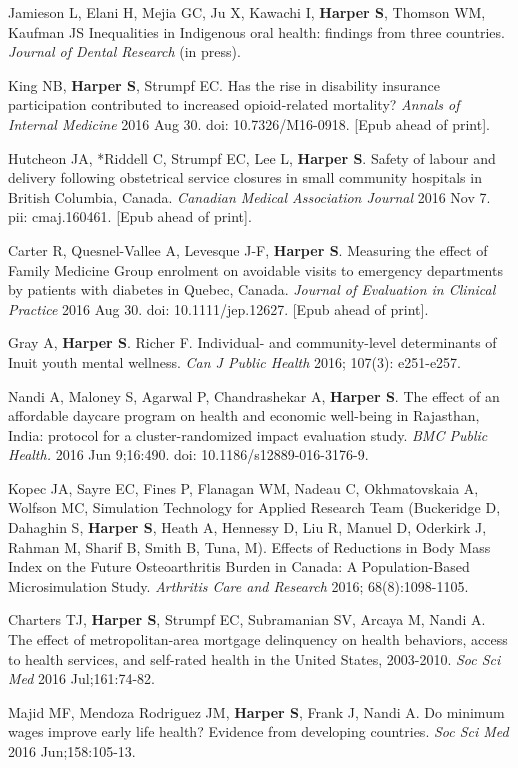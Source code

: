 \documentclass[
  letterpaper,
  DIV=11,
  numbers=noendperiod]{scrartcl}
\begin{document}
Jamieson L, Elani H, Mejia GC, Ju X, Kawachi I, \textbf{Harper S},
Thomson WM, Kaufman JS Inequalities in Indigenous oral health: findings
from three countries. \emph{Journal of Dental Research} (in press).

King NB, \textbf{Harper S}, Strumpf EC. Has the rise in disability
insurance participation contributed to increased opioid-related
mortality? \emph{Annals of Internal Medicine} 2016 Aug 30. doi:
10.7326/M16-0918. {[}Epub ahead of print{]}.

Hutcheon JA, *Riddell C, Strumpf EC, Lee L, \textbf{Harper S}. Safety of
labour and delivery following obstetrical service closures in small
community hospitals in British Columbia, Canada. \emph{Canadian Medical
Association Journal} 2016 Nov 7. pii: cmaj.160461. {[}Epub ahead of
print{]}.

Carter R, Quesnel-Vallee A, Levesque J-F, \textbf{Harper S}. Measuring
the effect of Family Medicine Group enrolment on avoidable visits to
emergency departments by patients with diabetes in Quebec, Canada.
\emph{Journal of Evaluation in Clinical Practice} 2016 Aug 30. doi:
10.1111/jep.12627. {[}Epub ahead of print{]}.

Gray A, \textbf{Harper S}. Richer F. Individual- and community-level
determinants of Inuit youth mental wellness. \emph{Can J Public Health}
2016; 107(3): e251-e257.

Nandi A, Maloney S, Agarwal P, Chandrashekar A, \textbf{Harper S}. The
effect of an affordable daycare program on health and economic
well-being in Rajasthan, India: protocol for a cluster-randomized impact
evaluation study. \emph{BMC Public Health.} 2016 Jun 9;16:490. doi:
10.1186/s12889-016-3176-9.

Kopec JA, Sayre EC, Fines P, Flanagan WM, Nadeau C, Okhmatovskaia A,
Wolfson MC, Simulation Technology for Applied Research Team (Buckeridge
D, Dahaghin S, \textbf{Harper S}, Heath A, Hennessy D, Liu R, Manuel D,
Oderkirk J, Rahman M, Sharif B, Smith B, Tuna, M). Effects of Reductions
in Body Mass Index on the Future Osteoarthritis Burden in Canada: A
Population-Based Microsimulation Study. \emph{Arthritis Care and
Research} 2016; 68(8):1098-1105.

Charters TJ, \textbf{Harper S}, Strumpf EC, Subramanian SV, Arcaya M,
Nandi A. The effect of metropolitan-area mortgage delinquency on health
behaviors, access to health services, and self-rated health in the
United States, 2003-2010. \emph{Soc Sci Med} 2016 Jul;161:74-82.

Majid MF, Mendoza Rodriguez JM, \textbf{Harper S}, Frank J, Nandi A. Do
minimum wages improve early life health? Evidence from developing
countries. \emph{Soc Sci Med} 2016 Jun;158:105-13.
\end{document}
